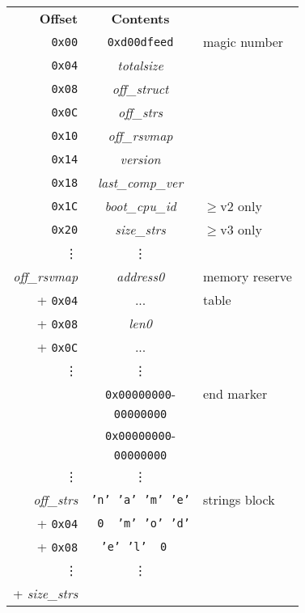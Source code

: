 \documentclass[a4paper,twocolumn]{article}
\newcommand{\tge}{$\geqslant$}
\begin{document}
\begin{figure}[htb!]
  \centering
  \footnotesize
  \begin{tabular}{r|c|l}
    \multicolumn{1}{r}{\textbf{Offset}}& \multicolumn{1}{c}{\textbf{Contents}} \\\cline{2-2}
    \texttt{0x00} & \texttt{0xd00dfeed} & magic number \\\cline{2-2}
    \texttt{0x04} & \emph{totalsize} \\\cline{2-2}
    \texttt{0x08} & \emph{off\_struct} & \\\cline{2-2}
    \texttt{0x0C} & \emph{off\_strs} & \\\cline{2-2}
    \texttt{0x10} & \emph{off\_rsvmap} & \\\cline{2-2}
    \texttt{0x14} & \emph{version} \\\cline{2-2}
    \texttt{0x18} & \emph{last\_comp\_ver} & \\\cline{2-2}
    \texttt{0x1C} & \emph{boot\_cpu\_id} & \tge v2 only\\\cline{2-2}
    \texttt{0x20} & \emph{size\_strs} & \tge v3 only\\\cline{2-2}
    \multicolumn{1}{r}{\vdots} & \multicolumn{1}{c}{\vdots} & \\\cline{2-2}
    \emph{off\_rsvmap} & \emph{address0} & memory reserve \\
    + \texttt{0x04} & ...& table \\\cline{2-2}
    + \texttt{0x08} & \emph{len0} & \\
    + \texttt{0x0C} & ...& \\\cline{2-2}
    \vdots & \multicolumn{1}{c|}{\vdots} & \\\cline{2-2}
    & \texttt{0x00000000}- & end marker\\
    & \texttt{00000000} & \\\cline{2-2}
    & \texttt{0x00000000}- & \\
    & \texttt{00000000} & \\\cline{2-2}
    \multicolumn{1}{r}{\vdots} & \multicolumn{1}{c}{\vdots} & \\\cline{2-2}
    \emph{off\_strs} & \texttt{'n' 'a' 'm' 'e'} & strings block \\
    + \texttt{0x04} & \texttt{~0~ 'm' 'o' 'd'} & \\
    + \texttt{0x08} & \texttt{'e' 'l' ~0~ \makebox[\widthof{~~~}]{\textrm{...}}} & \\
    \vdots & \multicolumn{1}{c|}{\vdots} & \\\cline{2-2}
    \multicolumn{1}{r}{+ \emph{size\_strs}} \\

\end{tabular}
\end{figure}
\end{document}
